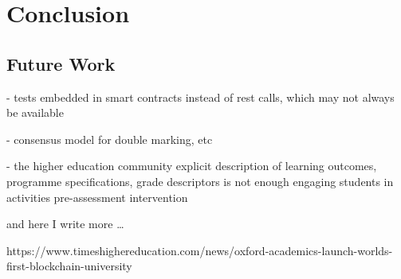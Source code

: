 \chapter{Conclusion}

\section{Future Work}

- tests embedded in smart contracts instead of rest calls, which may not always be available

- consensus model for double marking, etc

- the higher education community explicit description of learning outcomes, programme specifications, grade descriptors is not enough
engaging students in activities pre-assessment intervention \citep{bryan2006innovative}

and here I write more \dots

https://www.timeshighereducation.com/news/oxford-academics-launch-worlds-first-blockchain-university